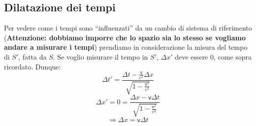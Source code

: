 \subsection{Dilatazione dei tempi}
Per vedere come i tempi sono ``influenzati'' da un cambio di sistema di
riferimento (\textbf{Attenzione: dobbiamo imporre che lo spazio sia lo
stesso se vogliamo andare a misurare i tempi}) prendiamo in
considerazione la misura del tempo di $S'$, fatta da $S$. Se voglio
misurare il tempo in $S'$, $\Delta x'$ deve essere $0$, come sopra
ricordato. Dunque:
\begin{displaymath}
\Delta t'=\frac{\Delta t-\frac{\mathsf{v}}{c^2}\Delta
  x}{\sqrt{1-\frac{\mathsf{v}^2}{c^2}}}
\end{displaymath}
\begin{displaymath}
\Delta x'=0=\frac{\Delta x-\mathsf{v}\Delta
  t}{\sqrt{1-\frac{\mathsf{v}^2}{c^2}}}
\end{displaymath}
\begin{displaymath}
\Longrightarrow \Delta x=\mathsf{v}\Delta t
\end{displaymath}
